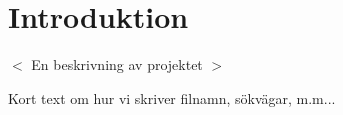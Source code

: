 \section{Introduktion}
$<$ En beskrivning av projektet $>$

Kort text om hur vi skriver filnamn, sökvägar, m.m...
